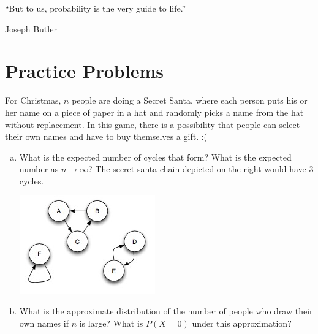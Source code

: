 \documentclass[11pt]{article}
\begin{document}

\setlength{\epigraphwidth}{.6\textwidth}
\epigraph{“But to us, probability is the very guide to life.”}{Joseph Butler}

\section*{Practice Problems}
\begin{exercise}
For Christmas, $n$ people are doing a Secret Santa, where each person puts his or her name on a piece of paper in a hat and randomly picks a name from the hat without replacement. In this game, there is a possibility that people can select their own names and have to buy themselves a gift. :(
 \begin{enumerate}[a)] \itemsep 1.5in
         \item What is the expected number of cycles that form? What is the expected number as $n \rightarrow \infty$? The secret santa chain depicted on the right would have 3 cycles.\\

         \begin{center}
         \includegraphics[scale=0.6]{cycles.jpg}
         \end{center}

         \item What is the approximate distribution of the number of people who draw their own names if $n$ is large? What is $P(X=0)$ under this approximation?

 \end{enumerate}
\end{exercise}
\end{document}
